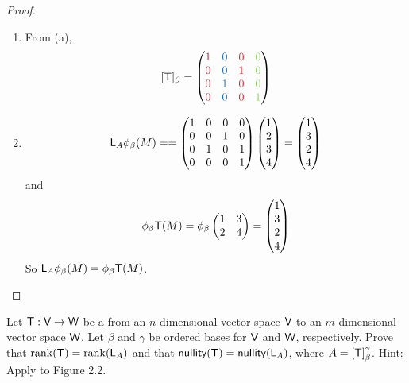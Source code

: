 \begin{proof} \ 

\begin{enumerate}
\item From (a),
\[
    [\T]_{\beta}
    = \begin{pmatrix}
        \MAROON{1} & \BLUE{0} & \RED{0} & \GREEN{0} \\
        \MAROON{0} & \BLUE{0} & \RED{1} & \GREEN{0} \\
        \MAROON{0} & \BLUE{1} & \RED{0} & \GREEN{0} \\
        \MAROON{0} & \BLUE{0} & \RED{0} & \GREEN{1}
    \end{pmatrix}
\]

\item
\[
    \textsf{L}_A \phi_{\beta}(M) = 
    = \begin{pmatrix}
        1 & 0 & 0 & 0 \\
        0 & 0 & 1 & 0 \\
        0 & 1 & 0 & 1 \\
        0 & 0 & 0 & 1
    \end{pmatrix}
    \begin{pmatrix} 1 \\ 2 \\ 3 \\4 \end{pmatrix}
    = \begin{pmatrix} 1 \\ 3 \\ 2 \\ 4 \end{pmatrix}
\]
and
\[
    \phi_{\beta}\textsf{T}(M)
    = \phi_{\beta}\begin{pmatrix} 1 & 3 \\ 2 & 4 \end{pmatrix}
    = \begin{pmatrix} 1 \\ 3 \\ 2 \\ 4 \end{pmatrix}
\]
So \(\textsf{L}_A \phi_{\beta}(M) = \phi_{\beta}\textsf{T}(M)\).
\end{enumerate}
\end{proof}

\begin{exercise} \label{exercise 2.4.20}
Let \(\textsf{T}: \textsf{V} \to \textsf{W}\) be a \LTRAN{} from an \(n\)-dimensional vector space \(\textsf{V}\) to an \(m\)-dimensional vector space \(\textsf{W}\).
Let \(\beta\) and \(\gamma\) be ordered bases for \(\textsf{V}\) and \(\textsf{W}\), respectively.
Prove that \(\mathrm{rank}(\textsf{T}) = \mathrm{rank}(\textsf{L}_A)\) and that \(\textsf{nullity}(\textsf{T}) = \textsf{nullity}(\textsf{L}_A)\), where \(A = [\textsf{T}]_{\beta}^{\gamma}\).
Hint: Apply  to Figure 2.2.
\end{exercise}


